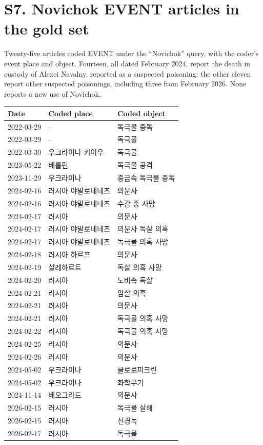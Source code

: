 \documentclass[11pt]{article}
\begin{document}
\section*{S7. Novichok EVENT articles in the gold set}
Twenty-five articles coded EVENT under the ``Novichok'' query, with the coder's event place and object. Fourteen, all dated February 2024, report the death in custody of Alexei Navalny, reported as a suspected poisoning; the other eleven report other suspected poisonings, including three from February 2026. None reports a new use of Novichok.\\[4pt]
\begin{tabular}{lll}\toprule Date & Coded place & Coded object \\\midrule
2022-03-29 & -- & 독극물 중독 \\
2022-03-29 & -- & 독극물 \\
2022-03-30 & 우크라이나 키이우 & 독극물 \\
2023-05-22 & 베를린 & 독극물 공격 \\
2023-11-29 & 우크라이나 & 중금속 독극물 중독 \\
2024-02-16 & 러시아 야말로네네츠 & 의문사 \\
2024-02-16 & 러시아 야말로네네츠 & 수감 중 사망 \\
2024-02-17 & 러시아 & 의문사 \\
2024-02-17 & 러시아 야말로네네츠 & 의문사 독살 의혹 \\
2024-02-17 & 러시아 야말로네네츠 & 독극물 의혹 사망 \\
2024-02-18 & 러시아 하르프 & 의문사 \\
2024-02-19 & 살레하르트 & 독살 의혹 사망 \\
2024-02-20 & 러시아 & 노비촉 독살 \\
2024-02-21 & 러시아 & 암살 의혹 \\
2024-02-21 & 러시아 & 의문사 \\
2024-02-21 & 러시아 & 독극물 의혹 사망 \\
2024-02-22 & 러시아 & 독극물 의혹 사망 \\
2024-02-25 & 러시아 & 의문사 \\
2024-02-26 & 러시아 & 의문사 \\
2024-05-02 & 우크라이나 & 클로로피크린 \\
2024-05-02 & 우크라이나 & 화학무기 \\
2024-11-14 & 베오그라드 & 의문사 \\
2026-02-15 & 러시아 & 독극물 살해 \\
2026-02-15 & 러시아 & 신경독 \\
2026-02-17 & 러시아 & 독극물 \\
\bottomrule\end{tabular}
\end{document}
